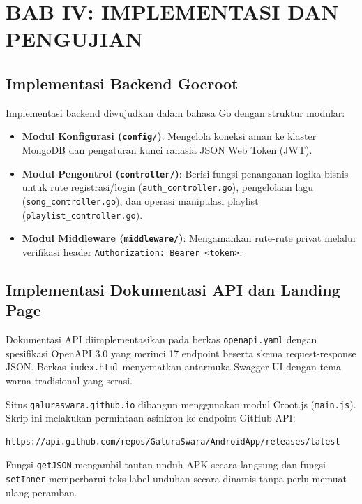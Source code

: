 \section{BAB IV: IMPLEMENTASI DAN PENGUJIAN}

\subsection{Implementasi Backend Gocroot}
Implementasi backend diwujudkan dalam bahasa Go dengan struktur modular:
\begin{itemize}
    \item \textbf{Modul Konfigurasi (\texttt{config/})}: Mengelola koneksi aman ke klaster MongoDB dan pengaturan kunci rahasia JSON Web Token (JWT).
    \item \textbf{Modul Pengontrol (\texttt{controller/})}: Berisi fungsi penanganan logika bisnis untuk rute registrasi/login (\texttt{auth\_controller.go}), pengelolaan lagu (\texttt{song\_controller.go}), dan operasi manipulasi playlist (\texttt{playlist\_controller.go}).
    \item \textbf{Modul Middleware (\texttt{middleware/})}: Mengamankan rute-rute privat melalui verifikasi header \texttt{Authorization: Bearer <token>}.
\end{itemize}

\subsection{Implementasi Dokumentasi API dan Landing Page}
Dokumentasi API diimplementasikan pada berkas \texttt{openapi.yaml} dengan spesifikasi OpenAPI 3.0 yang merinci 17 endpoint beserta skema request-response JSON. Berkas \texttt{index.html} menyematkan antarmuka Swagger UI dengan tema warna tradisional yang serasi.

Situs \texttt{galuraswara.github.io} dibangun menggunakan modul Croot.js (\texttt{main.js}). Skrip ini melakukan permintaan asinkron ke endpoint GitHub API:
\begin{verbatim}
https://api.github.com/repos/GaluraSwara/AndroidApp/releases/latest
\end{verbatim}
Fungsi \texttt{getJSON} mengambil tautan unduh APK secara langsung dan fungsi \texttt{setInner} memperbarui teks label unduhan secara dinamis tanpa perlu memuat ulang peramban.

